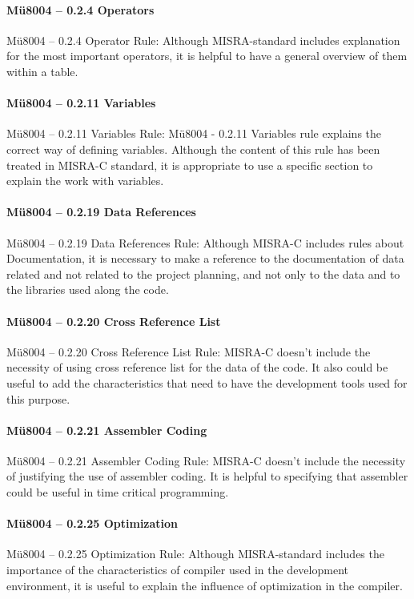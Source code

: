 \paragraph{Mü8004 – 0.2.4 Operators}
Mü8004 – 0.2.4 Operator Rule: Although MISRA-standard includes explanation for the most important operators, it is helpful to have a general overview of them within a table.

\paragraph{Mü8004 – 0.2.11 Variables}
Mü8004 – 0.2.11 Variables Rule: Mü8004 - 0.2.11 Variables rule explains the correct way of defining variables. Although the content of this rule has been treated in MISRA-C standard, it is appropriate to use a specific section to explain the work with variables.

\paragraph{Mü8004 – 0.2.19 Data References}
Mü8004 – 0.2.19 Data References Rule: Although MISRA-C includes rules about Documentation, it is necessary to make a reference to the documentation of data related and not related to the project planning, and not only to the data and to the libraries used along the code.

\paragraph{Mü8004 – 0.2.20 Cross Reference List}
Mü8004 – 0.2.20 Cross Reference List Rule: MISRA-C doesn’t include the necessity of using cross reference list for the data of the code. It also could be useful to add the characteristics that need to have the development tools used for this purpose.

\paragraph{Mü8004 – 0.2.21 Assembler Coding}
Mü8004 – 0.2.21 Assembler Coding Rule: MISRA-C doesn’t include the necessity of justifying the use of assembler coding. It is helpful to specifying that assembler could be useful in time critical programming.

\paragraph{Mü8004 – 0.2.25 Optimization}
Mü8004 – 0.2.25 Optimization Rule: Although MISRA-standard includes the importance of the characteristics of compiler used in the development environment, it is useful to explain the influence of optimization in the compiler.

